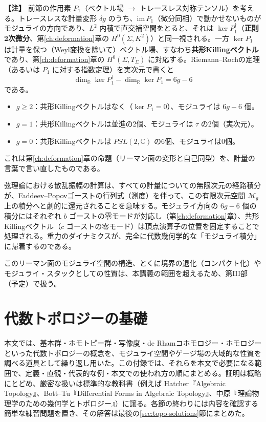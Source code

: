 \documentclass[uplatex, dvipdfmx, book]{jsbook}
\let\origsection\section
\let\origsubsection\subsection
\let\origsubsubsection\subsubsection
\newcommand{\chapter}{\origsection}
\renewcommand{\section}{\origsubsection}
\renewcommand{\subsection}{\origsubsubsection}
\renewcommand{\subsubsection}{\paragraph}
\newenvironment{note}{\vspace{1ex}\par\footnotesize\noindent\textbf{【注】}}{\par\vspace{1ex}}
\begin{document}
\begin{note}
前節の作用素 $P_1$（ベクトル場 $\to$ トレースレス対称テンソル）を考える。トレースレスな計量変形 $\delta g$ のうち、$\mathrm{im}\, P_1$（微分同相）で動かせないものがモジュライの方向であり、$L^2$ 内積で直交補空間をとると、それは $\ker P_1^\dagger$（\textbf{正則2次微分}、第\ref{ch:deformation}章の $H^0(\Sigma, K^2)$）と同一視される。一方 $\ker P_1$ は計量を保つ（Weyl変換を除いて）ベクトル場、すなわち\textbf{共形Killingベクトル}であり、第\ref{ch:deformation}章の $H^0(\Sigma, T_\Sigma)$ に対応する。Riemann--Rochの定理（あるいは $P_1$ に対する指数定理）を実次元で書くと
\begin{equation*}
    \dim_{\mathbb{R}} \ker P_1^\dagger - \dim_{\mathbb{R}} \ker P_1 = 6g - 6
\end{equation*}
である。
\begin{itemize}
    \item $g \ge 2$：共形Killingベクトルはなく（$\ker P_1 = 0$）、モジュライは $6g - 6$ 個。
    \item $g = 1$：共形Killingベクトルは並進の2個、モジュライは $\tau$ の2個（実次元）。
    \item $g = 0$：共形Killingベクトルは $PSL(2, \mathbb{C})$ の6個、モジュライは0個。
\end{itemize}
これは第\ref{ch:deformation}章の命題（リーマン面の変形と自己同型）を、計量の言葉で言い直したものである。
\end{note}

弦理論における散乱振幅の計算は、すべての計量についての無限次元の経路積分が、Faddeev--Popovゴーストの行列式（測度）を伴って、この有限次元空間 $\mathcal{M}_g$ 上の積分へと劇的に還元されることを意味する\cite{polchinskistringtheoryvolume12005}。モジュライ方向の $6g-6$ 個の積分にはそれぞれ $b$ ゴーストの零モードが対応し（第\ref{ch:deformation}章）、共形Killingベクトル（$c$ ゴーストの零モード）は頂点演算子の位置を固定することで処理される。重力のダイナミクスが、完全に代数幾何学的な「モジュライ積分」に帰着するのである。

このリーマン面のモジュライ空間の構造、とくに境界の退化（コンパクト化）やモジュライ・スタックとしての性質は、本講義の範囲を超えるため、第III部（予定）で扱う。

\appendix

\chapter{代数トポロジーの基礎}
\label{app:topology}

本文では、基本群・ホモトピー群・写像度・de Rhamコホモロジー・ホモロジーといった代数トポロジーの概念を、モジュライ空間やゲージ場の大域的な性質を調べる道具として繰り返し用いた。この付録では、それらを本文で必要になる範囲で、定義・直観・代表的な例・本文での使われ方の順にまとめる。証明は概略にとどめ、厳密な扱いは標準的な教科書（例えば Hatcher『Algebraic Topology』、Bott--Tu『Differential Forms in Algebraic Topology』、中原『理論物理学のための幾何学とトポロジー』）に譲る。各節の終わりには内容を確認する簡単な練習問題を置き、その解答は最後の\ref{sec:topo-solutions}節にまとめた。
\end{document}
